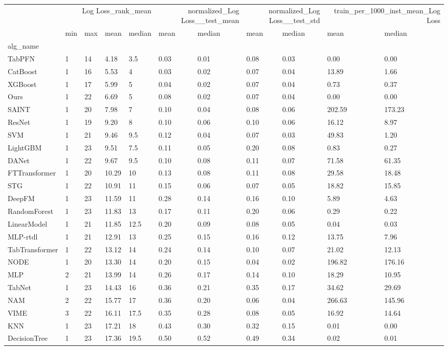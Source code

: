 \begin{tabular}{lllllllllll}
\toprule
 & \multicolumn{4}{r}{Log Loss_rank_mean} & \multicolumn{2}{r}{normalized_Log Loss__test_mean} & \multicolumn{2}{r}{normalized_Log Loss__test_std} & \multicolumn{2}{r}{train_per_1000_inst_mean_Log Loss} \\
 & min & max & mean & median & mean & median & mean & median & mean & median \\
alg_name &  &  &  &  &  &  &  &  &  &  \\
\midrule
TabPFN & 1 & 14 & 4.18 & 3.5 & 0.03 & 0.01 & 0.08 & 0.03 & 0.00 & 0.00 \\
CatBoost & 1 & 16 & 5.53 & 4 & 0.03 & 0.02 & 0.07 & 0.04 & 13.89 & 1.66 \\
XGBoost & 1 & 17 & 5.99 & 5 & 0.04 & 0.02 & 0.07 & 0.04 & 0.73 & 0.37 \\
Ours & 1 & 22 & 6.69 & 5 & 0.08 & 0.02 & 0.07 & 0.04 & 0.00 & 0.00 \\
SAINT & 1 & 20 & 7.98 & 7 & 0.10 & 0.04 & 0.08 & 0.06 & 202.59 & 173.23 \\
ResNet & 1 & 19 & 9.20 & 8 & 0.10 & 0.06 & 0.10 & 0.06 & 16.12 & 8.97 \\
SVM & 1 & 21 & 9.46 & 9.5 & 0.12 & 0.04 & 0.07 & 0.03 & 49.83 & 1.20 \\
LightGBM & 1 & 23 & 9.51 & 7.5 & 0.11 & 0.05 & 0.20 & 0.08 & 0.83 & 0.27 \\
DANet & 1 & 22 & 9.67 & 9.5 & 0.10 & 0.08 & 0.11 & 0.07 & 71.58 & 61.35 \\
FTTransformer & 1 & 20 & 10.29 & 10 & 0.13 & 0.08 & 0.11 & 0.08 & 29.58 & 18.48 \\
STG & 1 & 22 & 10.91 & 11 & 0.15 & 0.06 & 0.07 & 0.05 & 18.82 & 15.85 \\
DeepFM & 1 & 23 & 11.59 & 11 & 0.28 & 0.14 & 0.16 & 0.10 & 5.89 & 4.63 \\
RandomForest & 1 & 23 & 11.83 & 13 & 0.17 & 0.11 & 0.20 & 0.06 & 0.29 & 0.22 \\
LinearModel & 1 & 21 & 11.85 & 12.5 & 0.20 & 0.09 & 0.08 & 0.05 & 0.04 & 0.03 \\
MLP-rtdl & 1 & 21 & 12.91 & 13 & 0.25 & 0.15 & 0.16 & 0.12 & 13.75 & 7.96 \\
TabTransformer & 1 & 22 & 13.12 & 14 & 0.24 & 0.14 & 0.10 & 0.07 & 21.02 & 12.13 \\
NODE & 1 & 20 & 13.30 & 14 & 0.20 & 0.15 & 0.04 & 0.02 & 196.82 & 176.16 \\
MLP & 2 & 21 & 13.99 & 14 & 0.26 & 0.17 & 0.14 & 0.10 & 18.29 & 10.95 \\
TabNet & 1 & 23 & 14.43 & 16 & 0.36 & 0.21 & 0.35 & 0.17 & 34.62 & 29.69 \\
NAM & 2 & 22 & 15.77 & 17 & 0.36 & 0.20 & 0.06 & 0.04 & 266.63 & 145.96 \\
VIME & 3 & 22 & 16.11 & 17.5 & 0.35 & 0.28 & 0.08 & 0.05 & 16.92 & 14.64 \\
KNN & 1 & 23 & 17.21 & 18 & 0.43 & 0.30 & 0.32 & 0.15 & 0.01 & 0.00 \\
DecisionTree & 1 & 23 & 17.36 & 19.5 & 0.50 & 0.52 & 0.49 & 0.34 & 0.02 & 0.01 \\
\bottomrule
\end{tabular}
